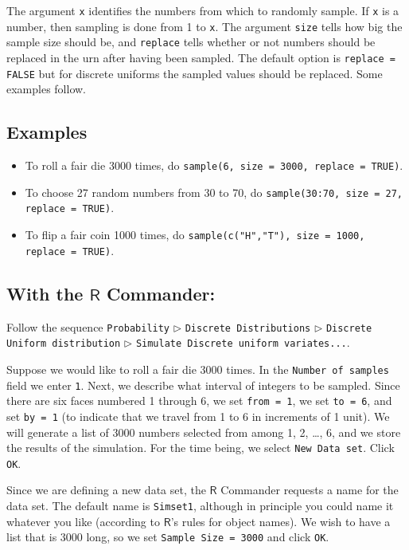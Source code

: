 \documentclass[captions=tableheading]{scrbook}
\begin{document}
The argument \texttt{x} identifies the numbers from which to randomly sample. If \texttt{x} is a number, then sampling is done from 1 to \texttt{x}. The argument \texttt{size} tells how big the sample size should be, and \texttt{replace} tells whether or not numbers should be replaced in the urn after having been sampled. The default option is \texttt{replace = FALSE} but for discrete uniforms the sampled values should be replaced. Some examples follow.
\subsection{Examples}
\label{sec-5-2-3}

\begin{itemize}
\item To roll a fair die 3000 times, do \texttt{sample(6, size = 3000, replace = TRUE)}.
\item To choose 27 random numbers from 30 to 70, do \texttt{sample(30:70, size = 27, replace = TRUE)}.
\item To flip a fair coin 1000 times, do \texttt{sample(c("H","T"), size = 1000, replace = TRUE)}.
\end{itemize}
\subsection{With the \(\mathsf{R}\) Commander:}
\label{sec-5-2-4}


Follow the sequence \texttt{Probability} \(\triangleright\) \texttt{Discrete Distributions} \(\triangleright\) \texttt{Discrete Uniform distribution} \(\triangleright\) \texttt{Simulate Discrete uniform variates...}.

Suppose we would like to roll a fair die 3000 times. In the \texttt{Number of samples} field we enter \texttt{1}. Next, we describe what interval of integers to be sampled. Since there are six faces numbered 1 through 6, we set \texttt{from = 1}, we set \texttt{to = 6}, and set \texttt{by = 1} (to indicate that we travel from 1 to 6 in increments of 1 unit). We will generate a list of 3000 numbers selected from among 1, 2, \ldots{}, 6, and we store the results of the simulation. For the time being, we select \texttt{New Data set}. Click \texttt{OK}.

Since we are defining a new data set, the \(\mathsf{R}\) Commander requests a name for the data set. The default name is \texttt{Simset1}, although in principle you could name it whatever you like (according to \(\mathsf{R}\)'s rules for object names). We wish to have a list that is 3000 long, so we set \texttt{Sample Size = 3000} and click \texttt{OK}.
\end{document}

